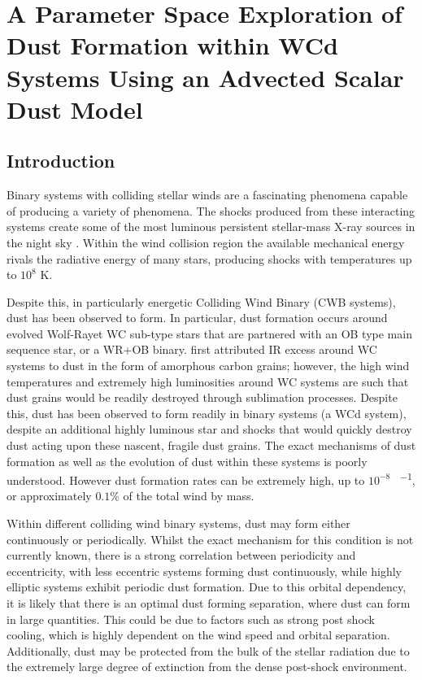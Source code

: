 \chapter[A Parameter Space Exploration of Dust Formation]{A Parameter Space Exploration of Dust Formation within WCd Systems Using an Advected Scalar Dust Model}
\label{chap:parameterspace}

\begin{abstract}
    
\end{abstract}

\section{Introduction}

Binary systems with colliding stellar winds are a fascinating phenomena capable of producing a variety of phenomena.
The shocks produced from these interacting systems create some of the most luminous persistent stellar-mass X-ray sources in the night sky \parencite{usov_stellar_1991}.
Within the wind collision region the available mechanical energy rivals the radiative energy of many stars, producing shocks with temperatures up to $10^8$ \si{\kelvin}.

Despite this, in particularly energetic Colliding Wind Binary (CWB systems), dust has been observed to form.
In particular, dust formation occurs around evolved Wolf-Rayet WC sub-type stars that are partnered with an OB type main sequence star, or a WR+OB binary.
\textcite{allenInfraredPhotometryNorthern1972} first attributed IR excess around WC systems to dust in the form of amorphous carbon grains; however, the high wind temperatures and extremely high luminosities around WC systems are such that dust grains would be readily destroyed through sublimation processes.
Despite this, dust has been observed to form readily in binary systems (a WCd system), despite an additional highly luminous star and shocks that would quickly destroy dust acting upon these nascent, fragile dust grains.
The exact mechanisms of dust formation as well as the evolution of dust within these systems is poorly understood.
However dust formation rates can be extremely high, up to $10^{-8}$ \si{\solarmass\per\year}, or approximately $0.1\%$ of the total wind by mass.


Within different colliding wind binary systems, dust may form either continuously or periodically.
Whilst the exact mechanism for this condition is not currently known, there is a strong correlation between periodicity and eccentricity, with less eccentric systems forming dust continuously, while highly elliptic systems exhibit periodic dust formation.
Due to this orbital dependency, it is likely that there is an optimal dust forming separation, where dust can form in large quantities. This could be due to factors such as strong post shock cooling, which is highly dependent on the wind speed and orbital separation.
Additionally, dust may be protected from the bulk of the stellar radiation due to the extremely large degree of extinction from the dense post-shock environment.

